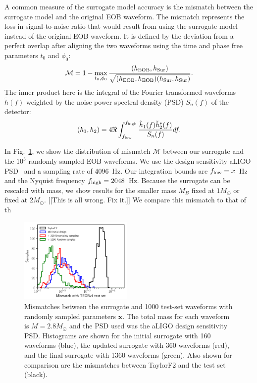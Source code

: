 \documentclass[prd,aps,letter,twocolumn,floatfix,notitlepage,nofootinbib]{revtex4-1}
\def\bx{\mathbf{x}}
\begin{document}
A common measure of the surrogate model accuracy is the mismatch between 
the surrogate model and the original EOB waveform.
The mismatch represents the loss in signal-to-noise ratio that would result 
from using the surrogate model instead of the original EOB waveform. 
It is defined by the deviation from a perfect overlap after aligning the two waveforms
using the time and phase free parameters $t_0$ and $\phi_0$:
\begin{equation}
\mathcal{M} = 1 - \max_{t_0, \phi_0} \frac{(h_{\rm EOB}, h_{\rm Sur})} {\sqrt{(h_{\rm EOB}, h_{\rm EOB}) (h_{\rm Sur}, h_{\rm Sur})}}.
\end{equation}
The inner product here  is the integral of the Fourier transformed waveforms $\tilde h(f)$ weighted by the noise power spectral 
density (PSD) $S_n(f)$ of the detector:
\begin{equation}
(h_1, h_2) = 4 \Re \int_{f_{\rm low}}^{f_{\rm high}} \frac{\tilde h_1(f) \tilde h^*_2(f)} {S_n(f)} df.
\end{equation}

In Fig.~\ref{fig:mismatch}, we show the distribution of mismatch $\mathcal{M}$ between our surrogate
and the $10^3$ randomly sampled EOB waveforms. We use the design sensitivity aLIGO PSD~\cite{Aasi:2013wya} and
a sampling rate of 4096~Hz. Our integration bounds are $f_{\rm low} = x$~Hz and the Nyquist frequency
$f_{\rm high} = 2048$~Hz. Because the surrogate can be rescaled with mass,
we show results for the smaller mass $M_B$ fixed at $1M_\odot$ or fixed at $2M_\odot$.
[[This is all wrong. Fix it.]]
We compare this mismatch to that of th

\begin{figure}[htb]
\centering
\includegraphics[width=0.49\textwidth]{mismatch.pdf}
\caption{Mismatches between the surrogate and 1000 test-set waveforms with randomly sampled parameters $\bx$. The total mass for each waveform is $M=2.8M_\odot$ and the PSD used was the aLIGO design sensitivity PSD. Histograms are shown for the initial surrogate with 160 waveforms (blue), the updated surrogate with 360 waveforms (red), and the final surrogate with 1360 waveforms (green). Also shown for comparison are the mismatches between TaylorF2 and the test set (black).}
\label{fig:mismatch}
\end{figure}
\end{document}
